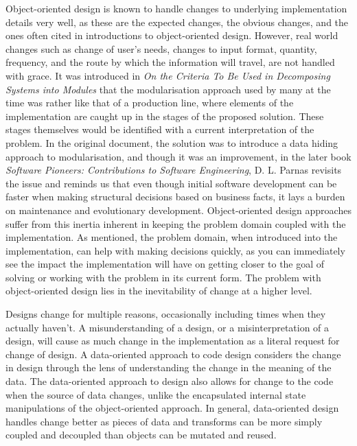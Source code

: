 \documentclass[a4paper,12pt]{book}
\begin{document}
Object-oriented design is known to handle changes to underlying implementation details very well, as these are the expected changes, the obvious changes, and the ones often cited in introductions to object-oriented design.
However, real world changes such as change of user's needs, changes to input format, quantity, frequency, and the route by which the information will travel, are not handled with grace.
It was introduced in \textit{On the Criteria To Be Used in Decomposing Systems into Modules} that the modularisation approach used by many at the time was rather like that of a production line, where elements of the implementation are caught up in the stages of the proposed solution.
These stages themselves would be identified with a current interpretation of the problem.
In the original document, the solution was to introduce a data hiding approach to modularisation, and though it was an improvement, in the later book \textit{Software Pioneers: Contributions to Software Engineering}, D. L. Parnas revisits the issue and reminds us that even though initial software development can be faster when making structural decisions based on business facts, it lays a burden on maintenance and evolutionary development.
Object-oriented design approaches suffer from this inertia inherent in keeping the problem domain coupled with the implementation.
As mentioned, the problem domain, when introduced into the implementation, can help with making decisions quickly, as you can immediately see the impact the implementation will have on getting closer to the goal of solving or working with the problem in its current form.
The problem with object-oriented design lies in the inevitability of change at a higher level.

Designs change for multiple reasons, occasionally including times when they actually haven't.
A misunderstanding of a design, or a misinterpretation of a design, will cause as much change in the implementation as a literal request for change of design.
A data-oriented approach to code design considers the change in design through the lens of understanding the change in the meaning of the data.
The data-oriented approach to design also allows for change to the code when the source of data changes, unlike the encapsulated internal state manipulations of the object-oriented approach.
In general, data-oriented design handles change better as pieces of data and transforms can be more simply coupled and decoupled than objects can be mutated and reused.
\end{document}
